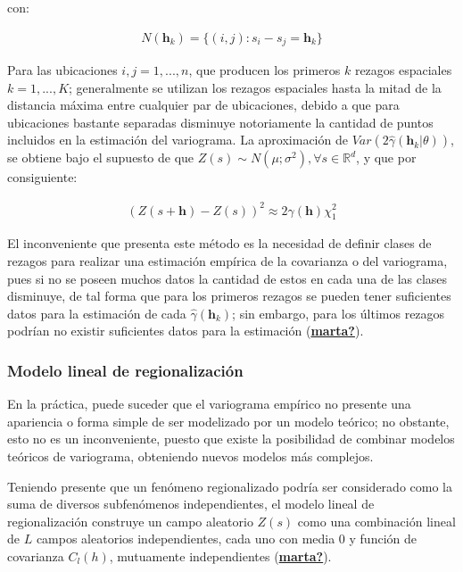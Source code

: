 \documentclass[
]{book}
\begin{document}
con:

\begin{align}
  N(\textbf{h}_k)=\{(i,j):s_i-s_j=\textbf{h}_k\}  
\end{align}

Para las ubicaciones \(i,j=1,...,n\), que producen los primeros \(k\) rezagos espaciales \(k=1,...,K\); generalmente se utilizan los rezagos espaciales hasta la mitad de la distancia máxima entre cualquier par de ubicaciones, debido a que para ubicaciones bastante separadas disminuye notoriamente la cantidad de puntos incluidos en la estimación del variograma. La aproximación de \(Var(2\hat{\gamma}(\textbf{h}_k|\theta))\), se obtiene bajo el supuesto de que \(Z(s)\sim N(\mu;\sigma^2), \forall s\in \mathbb{R}^d\), y que por consiguiente:

\begin{align}
  (Z(s+\textbf{h})-Z(s))^2\approx 2\gamma(\textbf{h})\chi_1^2   
\end{align}

El inconveniente que presenta este método es la necesidad de definir clases de rezagos para realizar una estimación empírica de la covarianza o del variograma, pues si no se poseen muchos datos la cantidad de estos en cada una de las clases disminuye, de tal forma que para los primeros rezagos se pueden tener suficientes datos para la estimación de cada \(\hat{\gamma}(\textbf{h}_k)\); sin embargo, para los últimos rezagos podrían no existir suficientes datos para la estimación (\protect\hyperlink{ref-marta}{\textbf{marta?}}).

\hypertarget{modelo-lineal-de-regionalizaciuxf3n}{%
\subsubsection*{Modelo lineal de regionalización}\label{modelo-lineal-de-regionalizaciuxf3n}}

En la práctica, puede suceder que el variograma empírico no presente una apariencia o forma simple de ser modelizado por un modelo teórico; no obstante, esto no es un inconveniente, puesto que existe la posibilidad de combinar modelos teóricos de variograma, obteniendo nuevos modelos más complejos.

Teniendo presente que un fenómeno regionalizado podría ser considerado como la suma de diversos subfenómenos independientes, el modelo lineal de regionalización construye un campo aleatorio \(Z(s)\) como una combinación lineal de \(L\) campos aleatorios independientes, cada uno con media 0 y función de covarianza \(C_l(h)\), mutuamente independientes (\protect\hyperlink{ref-marta}{\textbf{marta?}}).
\end{document}
